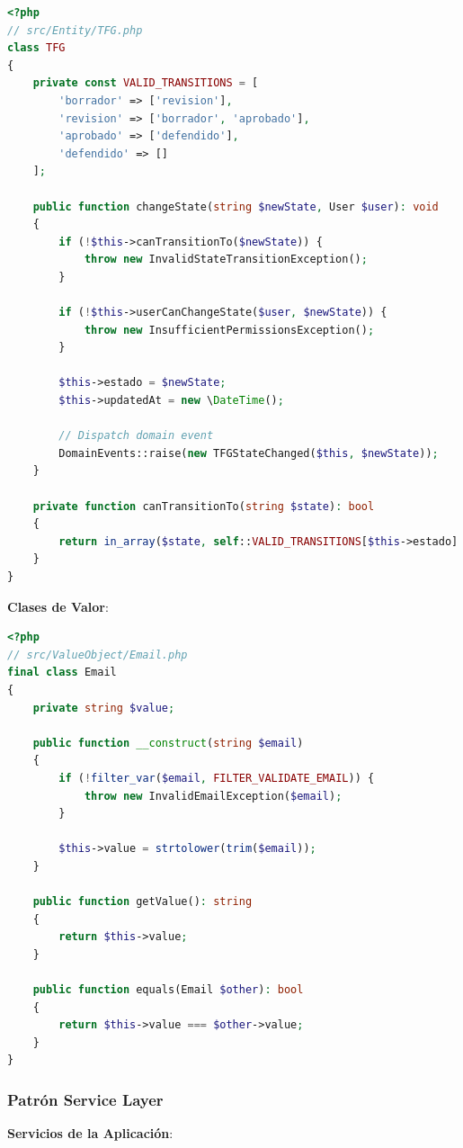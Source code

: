 \documentclass[12pt,a4paper,oneside]{report}
\begin{document}
\begin{lstlisting}[language=PHP]
<?php
// src/Entity/TFG.php
class TFG
{
    private const VALID_TRANSITIONS = [
        'borrador' => ['revision'],
        'revision' => ['borrador', 'aprobado'],
        'aprobado' => ['defendido'],
        'defendido' => []
    ];
    
    public function changeState(string $newState, User $user): void
    {
        if (!$this->canTransitionTo($newState)) {
            throw new InvalidStateTransitionException();
        }
        
        if (!$this->userCanChangeState($user, $newState)) {
            throw new InsufficientPermissionsException();
        }
        
        $this->estado = $newState;
        $this->updatedAt = new \DateTime();
        
        // Dispatch domain event
        DomainEvents::raise(new TFGStateChanged($this, $newState));
    }
    
    private function canTransitionTo(string $state): bool
    {
        return in_array($state, self::VALID_TRANSITIONS[$this->estado] ?? []);
    }
}
\end{lstlisting}

\textbf{Clases de Valor}:

\begin{lstlisting}[language=PHP]
<?php
// src/ValueObject/Email.php
final class Email
{
    private string $value;
    
    public function __construct(string $email)
    {
        if (!filter_var($email, FILTER_VALIDATE_EMAIL)) {
            throw new InvalidEmailException($email);
        }
        
        $this->value = strtolower(trim($email));
    }
    
    public function getValue(): string
    {
        return $this->value;
    }
    
    public function equals(Email $other): bool
    {
        return $this->value === $other->value;
    }
}
\end{lstlisting}

\subsubsection{Patrón Service Layer}\label{patruxf3n-service-layer}

\textbf{Servicios de la Aplicación}:
\end{document}
